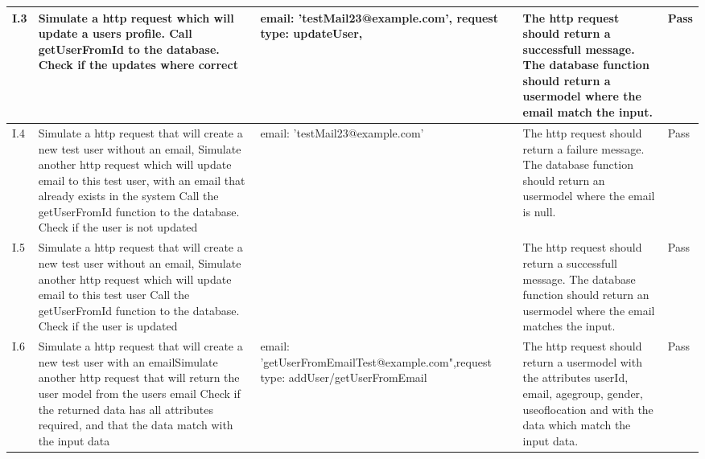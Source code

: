 \begin{appendices}
\begin{center}
\begin{longtable}{ | p{1cm} | p{5.5cm} | p{4cm} | p{4.5cm} | p{2cm}|}
		I.3 & Simulate a http request which will update a users profile. \newline Call getUserFromId to the database.  \newline Check if the updates where correct & email: 'testMail23@example.com', request type: updateUser,  & The http request should return a successfull message. The database function should return a usermodel where the email match the input.& Pass\\ \hline
		
		I.4 & Simulate a http request that will create a new test user without an email, Simulate another http request which will update email to this test user, with an email that already exists in the system \newline  Call the getUserFromId function to the database. \newline Check if the user is not updated & email: 'testMail23@example.com' & The http request should return a failure message. The database function should return an usermodel where the email is null. & Pass\\ \hline
		
		I.5 & Simulate a http request that will create a new test user without an email, \newline Simulate another http request which will update email to this test user \newline  Call the getUserFromId function to the database. \newline Check if the user is updated &  & The http request should return a successfull message. The database function should return an usermodel where the email matches the input. & Pass\\ \hline
		
		I.6 & Simulate a http request that will create a new test user with an email\newline  Simulate another http request that will return the user model from the users email \newline Check if the returned data has all attributes required, and that the data match with the input data & email: 'getUserFromEmailTest@example.com",\newline request type: addUser/getUserFromEmail  & The http request should return a usermodel with the attributes userId, email, age\textunderscore group, gender, use\textunderscore of\textunderscore location and with the data which match the input data.& Pass \\ \hline
		

\end{longtable}
\end{center}
\end{appendices}
